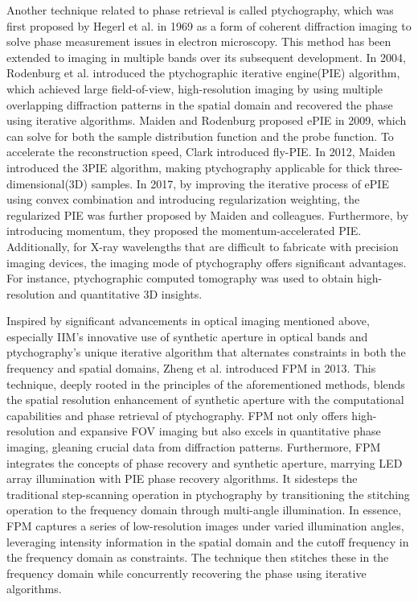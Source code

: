 \documentclass[journal,review,submit,pdftex,moreauthors]{Definitions/mdpi}
\begin{document}
Another technique related to phase retrieval is called ptychography\cite{hoppe1969beugung}, which was first proposed by Hegerl et al. in 1969 as a form of coherent diffraction imaging to solve phase measurement issues in electron microscopy. This method has been extended to imaging in multiple bands over its subsequent development. In 2004, Rodenburg et al. introduced the ptychographic iterative engine(PIE)\cite{rodenburg2004phase,faulkner2004movable} algorithm, which achieved large field-of-view, high-resolution imaging by using multiple overlapping diffraction patterns in the spatial domain and recovered the phase using iterative algorithms. Maiden and Rodenburg proposed ePIE\cite{maiden2009improved} in 2009, which can solve for both the sample distribution function and the probe function. To accelerate the reconstruction speed, Clark introduced fly-PIE\cite{clark2014continuous}. In 2012, Maiden introduced the 3PIE\cite{maiden2012ptychographic} algorithm, making ptychography applicable for thick three-dimensional(3D) samples. In 2017, by improving the iterative process of ePIE using convex combination and introducing regularization weighting, the regularized PIE\cite{maiden2017further} was further proposed by Maiden and colleagues. Furthermore, by introducing momentum, they proposed the momentum-accelerated PIE\cite{maiden2017further}. Additionally, for X-ray\cite{pfeiffer2018x} wavelengths that are difficult to fabricate with precision imaging devices, the imaging mode of ptychography offers significant advantages. For instance, ptychographic computed tomography\cite{dierolf2010ptychographic,diaz2012quantitative} was used to obtain high-resolution and quantitative 3D insights.

Inspired by significant advancements in optical imaging mentioned above, especially IIM's innovative use of synthetic aperture in optical bands and ptychography's unique iterative algorithm that alternates constraints in both the frequency and spatial domains, Zheng et al. introduced FPM\cite{zheng2013wide} in 2013. This technique, deeply rooted in the principles of the aforementioned methods, blends the spatial resolution enhancement of synthetic aperture with the computational capabilities and phase retrieval of ptychography. FPM not only offers high-resolution and expansive FOV imaging but also excels in quantitative phase imaging, gleaning crucial data from diffraction patterns. Furthermore, FPM integrates the concepts of phase recovery and synthetic aperture, marrying LED array illumination with PIE phase recovery algorithms. It sidesteps the traditional step-scanning operation in ptychography by transitioning the stitching operation to the frequency domain through multi-angle illumination\cite{horstmeyer2014phase}. In essence, FPM captures a series of low-resolution images under varied illumination angles, leveraging intensity information in the spatial domain and the cutoff frequency in the frequency domain as constraints. The technique then stitches these in the frequency domain while concurrently recovering the phase using iterative algorithms.
\end{document}
